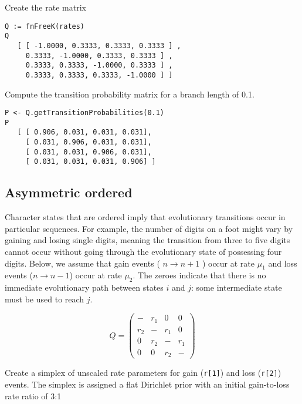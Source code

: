 Create the rate matrix
{\tt \begin{snugshade*}
\begin{lstlisting}
Q := fnFreeK(rates)
Q
   [ [ -1.0000, 0.3333, 0.3333, 0.3333 ] ,
     0.3333, -1.0000, 0.3333, 0.3333 ] ,
     0.3333, 0.3333, -1.0000, 0.3333 ] ,
     0.3333, 0.3333, 0.3333, -1.0000 ] ]
\end{lstlisting}
\end{snugshade*}}

Compute the transition probability matrix for a branch length of 0.1.

{\tt \begin{snugshade*}
\begin{lstlisting}
P <- Q.getTransitionProbabilities(0.1)
P
   [ [ 0.906, 0.031, 0.031, 0.031],
     [ 0.031, 0.906, 0.031, 0.031],
     [ 0.031, 0.031, 0.906, 0.031],
     [ 0.031, 0.031, 0.031, 0.906] ]
\end{lstlisting}
\end{snugshade*}}



\subsection{Asymmetric ordered}

Character states that are ordered imply that evolutionary transitions occur in particular sequences.
For example, the number of digits on a foot might vary by gaining and losing single digits, meaning the transition from three to five digits cannot occur without going through the evolutionary state of possessing four digits.
Below, we assume that gain events ( $n \rightarrow n+1$ ) occur at rate $\mu_1$ and loss events ($n \rightarrow n-1$) occur at rate $\mu_2$.
The zeroes indicate that there is no immediate evolutionary path between states $i$ and $j$: some intermediate state must be used to reach $j$.

\begin{equation*}
Q = \begin{pmatrix}
- & r_1 & 0 & 0 \\
r_2 & -   & r_1 & 0 \\
0 & r_2 & -   & r_1 \\
0 & 0 & r_2 & - 
\end{pmatrix}
\end{equation*}


Create a simplex of unscaled rate parameters for gain ({\tt r[1]}) and loss ({\tt r[2]}) events.
The simplex is assigned a flat Dirichlet prior with an initial gain-to-loss rate ratio of 3:1


